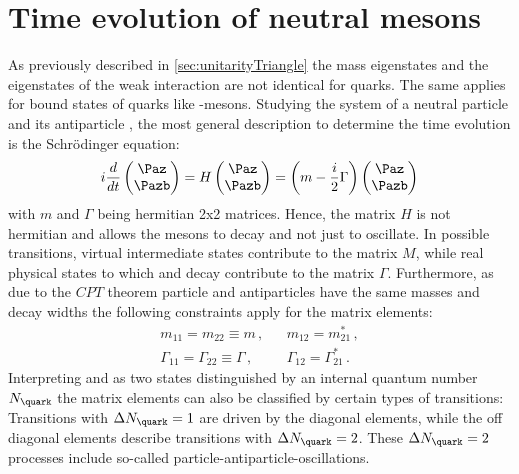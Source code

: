 \section[head={Time evolution of neutral mesons},tocentry={Time evolution of neutral mesons}]{Time evolution of neutral mesons}
\label{sec:TimeEvolution}

As previously described in \cref{sec:unitarityTriangle} the mass eigenstates and the eigenstates of the weak interaction are not identical for quarks.
The same applies for bound states of quarks like \B-mesons.
Studying the system of a neutral particle \Paz and its antiparticle \Pazb, the most general description to determine the time evolution is the Schrödinger equation:
\begin{equation}
i\frac{d}{dt}\begin{pmatrix} \Paz \\ \Pazb \end{pmatrix} = H \begin{pmatrix} \Paz \\ \Pazb \end{pmatrix}
=\left(m-\frac{i}{2}\Gamma\right)\begin{pmatrix} \Paz \\ \Pazb \end{pmatrix} \label{eq:mixMatrix}
\end{equation}
with $m$ and $\Gamma$ being hermitian 2x2 matrices.
Hence, the matrix $H$ is not hermitian and allows the \B mesons to decay and not just to oscillate.
In possible transitions, virtual intermediate states contribute to the matrix $M$, while real physical states to which \Paz and \Pazb decay contribute to the matrix $\Gamma$.
Furthermore, as due to the $CPT$ theorem particle and antiparticles have the same masses and decay widths the following constraints apply for the matrix elements:
\begin{equation}
\begin{aligned}
&m_{11}=m_{22}\equiv m\,,&&m_{12}=m_{21}^\ast\,,&\\
&\Gamma_{11}=\Gamma_{22}\equiv\Gamma\,,&&\Gamma_{12}=\Gamma_{21}^\ast\,.&
\end{aligned}
\end{equation}
Interpreting \Paz and \Pazb as two states distinguished by an internal quantum number $N_\quark$ the matrix elements can also be classified by certain types of transitions:
Transitions with $\Delta N_\quark=1$ are driven by the diagonal elements, while the off diagonal elements describe transitions with $\Delta N_\quark=2$.
These $\Delta N_\quark=2$ processes include so-called particle-antiparticle-oscillations.

